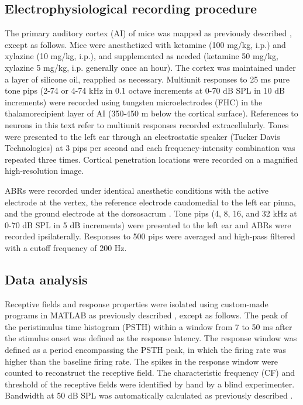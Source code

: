 \subsection{Electrophysiological recording procedure}

The primary auditory cortex (AI) of mice was mapped as previously described \cite{Kim2009}, except as follows. Mice were anesthetized with ketamine (100 mg/kg, i.p.) and xylazine (10 mg/kg, i.p.), and supplemented as needed (ketamine 50 mg/kg, xylazine 5 mg/kg, i.p. generally once an hour). The cortex was maintained under a layer of silicone oil, reapplied as necessary. Multiunit responses to 25 ms pure tone pips (2-74 or 4-74 kHz in 0.1 octave increments at 0-70 dB SPL in 10 dB increments) were recorded using tungsten microelectrodes (FHC) in the thalamorecipient layer of AI (350-450 \textmu{}m below the cortical surface). References to neurons in this text refer to multiunit responses recorded extracellularly. Tones were presented to the left ear through an electrostatic speaker (Tucker Davis Technologies) at 3 pips per second and each frequency-intensity combination was repeated three times. Cortical penetration locations were recorded on a magnified high-resolution image.

ABRs were recorded under identical anesthetic conditions with the active electrode at the vertex, the reference electrode caudomedial to the left ear pinna, and the ground electrode at the dorsosacrum \cite{OConnor1998, Popescu2010a}. Tone pips (4, 8, 16, and 32 kHz at 0-70 dB SPL in 5 dB increments) were presented to the left ear and ABRs were recorded ipsilaterally. Responses to 500 pips were averaged and high-pass filtered with a cutoff frequency of 200 Hz.

\subsection{Data analysis}

Receptive fields and response properties were isolated using custom-made programs in MATLAB as previously described \cite{Insanally2010}, except as follows. The peak of the peristimulus time histogram (PSTH) within a window from 7 to 50 ms after the stimulus onset was defined as the response latency. The response window was defined as a period encompassing the PSTH peak, in which the firing rate was higher than the baseline firing rate. The spikes in the response window were counted to reconstruct the receptive field. The characteristic frequency (CF) and threshold of the receptive fields were identified by hand by a blind experimenter. Bandwidth at 50 dB SPL was automatically calculated as previously described \cite{Insanally2010}.

